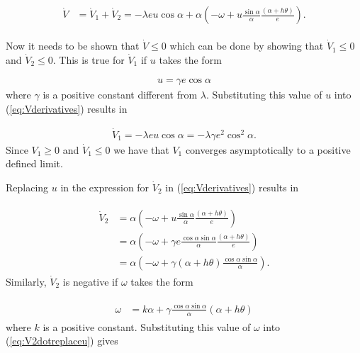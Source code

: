 \begin{align}
\label{eq:lyapunovfunctionderivative}
\begin{split}
\dot{V} &= \dot{V}_1 + \dot{V}_2 = -\lambda e u\cos\alpha + \alpha\left(-\omega+u\frac{\sin\alpha}{\alpha}\frac{(\alpha+h\theta)}{e}\right).
\end{split}
\end{align}

Now it needs to be shown that $\dot{V}\leq0$ which can be done by showing that $\dot{V}_1\leq0$ and $\dot{V}_2\leq0$. This is true for $\dot{V}_1$ if $u$ takes the form

\begin{align}
\label{eq:lyapunovu}
u = \gamma e\cos\alpha
\end{align}
where $\gamma$ is a positive constant different from $\lambda$. Substituting this value of $u$ into (\ref{eq:Vderivatives}) results in

\begin{align}
\label{eq:V1dotfinal}
\dot{V}_1 = -\lambda eu\cos\alpha = -\lambda\gamma e^2\cos^2\alpha.
\end{align}
Since $V_1\geq0$ and $\dot{V}_1\leq0$ we have that $V_1$ converges asymptotically to a positive defined limit.

Replacing $u$ in the expression for $\dot{V}_2$ in (\ref{eq:Vderivatives}) results in

\begin{align}
\label{eq:V2dotreplaceu}
\begin{split}
\dot{V}_2 &= \alpha\left(-\omega+u\frac{\sin\alpha}{\alpha}\frac{(\alpha+h\theta)}{e}\right) \\
&= \alpha\left(-\omega+\gamma e\frac{\cos\alpha\sin\alpha}{\alpha}\frac{(\alpha+h\theta)}{e}\right) \\
&= \alpha\left(-\omega+\gamma(\alpha+h\theta)\frac{\cos\alpha\sin\alpha}{\alpha}\right).
\end{split}
\end{align}
Similarly, $\dot{V}_2$ is negative if $\omega$ takes the form

\begin{align}
\label{eq:lyapunovomega}
\begin{split}
\omega &= k\alpha + \gamma\frac{\cos\alpha\sin\alpha}{\alpha}\left(\alpha+h\theta\right)
\end{split}
\end{align}
where $k$ is a positive constant. Substituting this value of $\omega$ into (\ref{eq:V2dotreplaceu}) gives

